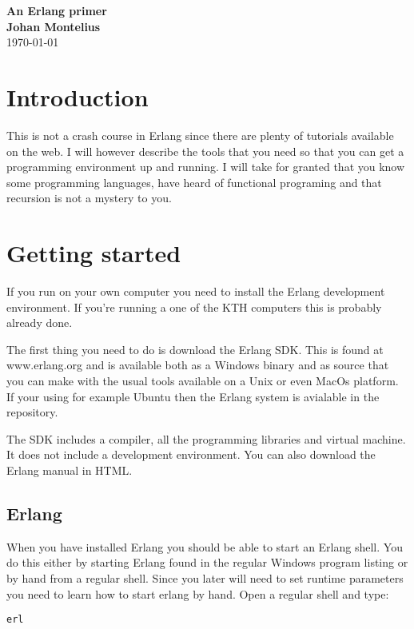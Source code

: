 \documentclass[a4paper, 11pt]{article}
\newcommand{\nnsection}[1]{
\section*{#1}
\addcontentsline{toc}{section}{#1}
}
\begin{document}
\begin{center}
\vspace{20pt}
\textbf{\large An Erlang primer}\\
\vspace{10pt}
\textbf{Johan Montelius}\\
\vspace{10pt}
\today{}
\end{center}

\nnsection{Introduction}

This is not a crash course in Erlang since there are plenty of
tutorials available on the web. I will however describe the tools that
you need so that you can get a programming environment up and
running. I will take for granted that you know some programming
languages, have heard of functional programing and that recursion is
not a mystery to you.

\section{Getting started}

If you run on your own computer you need to install the Erlang
development environment. If you're running a one of the KTH computers
this is probably already done.

The first thing you need to do is download the Erlang SDK. This is
found at www.erlang.org and is available both as a Windows binary and
as source that you can make with the usual tools available on a Unix
or even MacOs platform. If your using for example Ubuntu then the
Erlang system is avialable in the repository.

The SDK includes a compiler, all the programming libraries and virtual
machine. It does not include a development environment. You can also
download the Erlang manual in HTML.

\subsection{Erlang}

When you have installed Erlang you should be able to start an Erlang
shell. You do this either by starting Erlang found in the regular
Windows program listing or by hand from a regular shell. Since you
later will need to set runtime parameters you need to learn how to
start erlang by hand. Open a regular shell and type:

\begin{verbatim}
erl
\end{verbatim}
\end{document}
